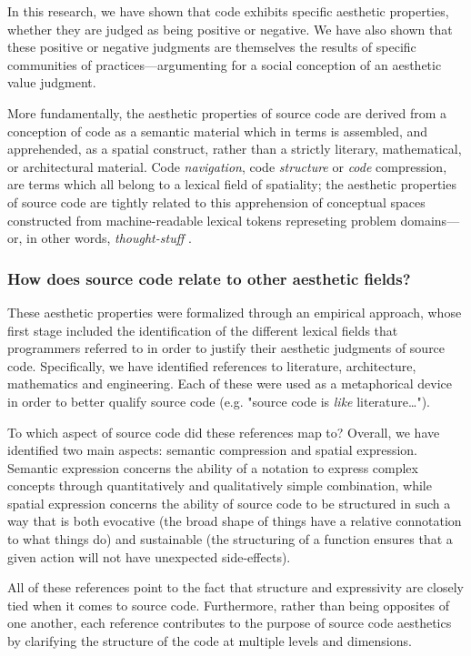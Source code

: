 In this research, we have shown that code exhibits specific aesthetic properties, whether they are judged as being positive or negative. We have also shown that these positive or negative judgments are themselves the results of specific communities of practices—argumenting for a social conception of an aesthetic value judgment.

More fundamentally, the aesthetic properties of source code are derived from a conception of code as a semantic material which in terms is assembled, and apprehended, as a spatial construct, rather than a strictly literary, mathematical, or architectural material. Code \emph{navigation}, code \emph{structure} or \emph{code} compression, are terms which all belong to a lexical field of spatiality; the aesthetic properties of source code are tightly related to this apprehension of conceptual spaces constructed from machine-readable lexical tokens represeting problem domains—or, in other words, \emph{thought-stuff} \citep{brooks_mythical_1975}.

\subsubsection{How does source code relate to other aesthetic fields?} %

These aesthetic properties were formalized through an empirical approach, whose first stage included the identification of the different lexical fields that programmers referred to in order to justify their aesthetic judgments of source code. Specifically, we have identified references to literature, architecture, mathematics and engineering. Each of these were used as a metaphorical device in order to better qualify source code (e.g. "source code is \emph{like} literature\dots").

To which aspect of source code did these references map to? Overall, we have identified two main aspects: semantic compression and spatial expression. Semantic expression concerns the ability of a notation to express complex concepts through quantitatively and qualitatively simple combination, while spatial expression concerns the ability of source code to be structured in such a way that is both evocative (the broad shape of things have a relative connotation to what things do) and sustainable (the structuring of a function ensures that a given action will not have unexpected side-effects).

All of these references point to the fact that structure and expressivity are closely tied when it comes to source code. Furthermore, rather than being opposites of one another, each reference contributes to the purpose of source code aesthetics by clarifying the structure of the code at multiple levels and dimensions.

